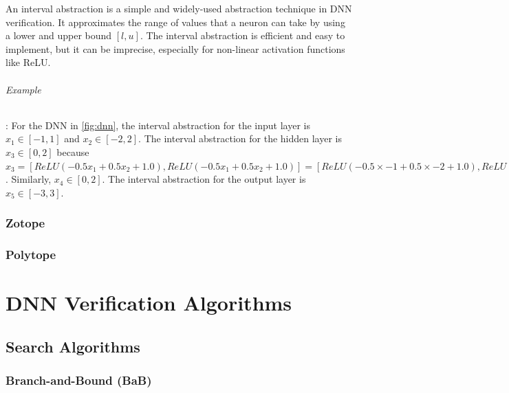 \documentclass[oneside,11pt,dvipsnames]{book}
\begin{document}
An interval abstraction is a simple and widely-used abstraction technique in DNN verification. It approximates the range of values that a neuron can take by using a lower and upper bound $[l, u]$. The interval abstraction is efficient and easy to implement, but it can be imprecise, especially for non-linear activation functions like ReLU. 

\paragraph{Example}: For the DNN in \autoref{fig:dnn}, the interval abstraction for the input layer is $x_1 \in [-1, 1]$ and $x_2 \in [-2, 2]$. The interval abstraction for the hidden layer is $x_3 \in [0, 2]$ because $x_3 = [ReLU(-0.5x_1 + 0.5x_2 + 1.0), ReLU(-0.5x_1 + 0.5x_2 + 1.0)] = [ReLU(-0.5 \times -1 + 0.5 \times -2 + 1.0), ReLU(-0.5 \times 1 + 0.5 \times 2 + 1.0)] = [0, 2]$. Similarly, $x_4 \in [0, 2]$. The interval abstraction for the output layer is $x_5 \in [-3, 3]$.




\section{Zotope}
\section{Polytope}



\part{DNN Verification Algorithms}
\chapter{Search Algorithms}

\section{Branch-and-Bound (BaB)}
\end{document}
